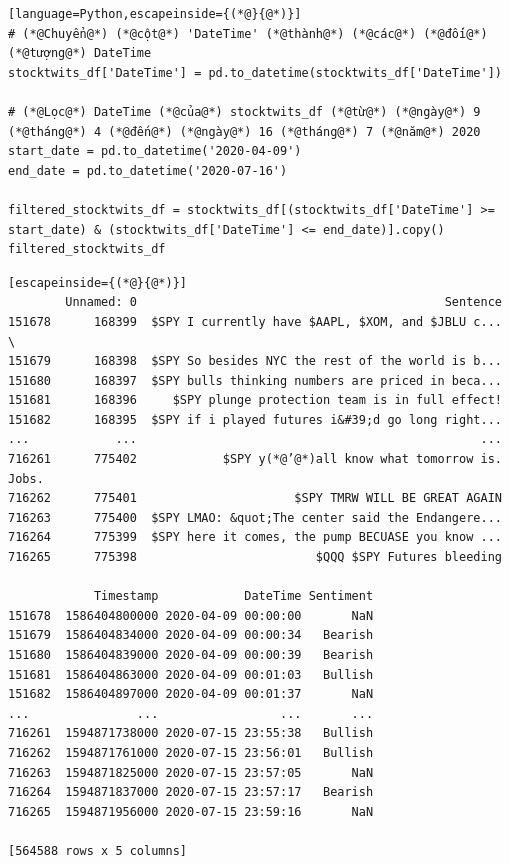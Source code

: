 \begin{lstlisting}[language=Python,escapeinside={(*@}{@*)}]
# (*@Chuyển@*) (*@cột@*) 'DateTime' (*@thành@*) (*@các@*) (*@đối@*) (*@tượng@*) DateTime
stocktwits_df['DateTime'] = pd.to_datetime(stocktwits_df['DateTime'])

# (*@Lọc@*) DateTime (*@của@*) stocktwits_df (*@từ@*) (*@ngày@*) 9 (*@tháng@*) 4 (*@đến@*) (*@ngày@*) 16 (*@tháng@*) 7 (*@năm@*) 2020
start_date = pd.to_datetime('2020-04-09')
end_date = pd.to_datetime('2020-07-16')

filtered_stocktwits_df = stocktwits_df[(stocktwits_df['DateTime'] >= start_date) & (stocktwits_df['DateTime'] <= end_date)].copy()
filtered_stocktwits_df
\end{lstlisting}

\begin{lstlisting}[escapeinside={(*@}{@*)}]
        Unnamed: 0                                           Sentence   
151678      168399  $SPY I currently have $AAPL, $XOM, and $JBLU c...  \
151679      168398  $SPY So besides NYC the rest of the world is b...   
151680      168397  $SPY bulls thinking numbers are priced in beca...   
151681      168396     $SPY plunge protection team is in full effect!   
151682      168395  $SPY if i played futures i&#39;d go long right...   
...            ...                                                ...   
716261      775402            $SPY y(*@’@*)all know what tomorrow is. Jobs.   
716262      775401                      $SPY TMRW WILL BE GREAT AGAIN   
716263      775400  $SPY LMAO: &quot;The center said the Endangere...   
716264      775399  $SPY here it comes, the pump BECUASE you know ...   
716265      775398                         $QQQ $SPY Futures bleeding   

            Timestamp            DateTime Sentiment  
151678  1586404800000 2020-04-09 00:00:00       NaN  
151679  1586404834000 2020-04-09 00:00:34   Bearish  
151680  1586404839000 2020-04-09 00:00:39   Bearish  
151681  1586404863000 2020-04-09 00:01:03   Bullish  
151682  1586404897000 2020-04-09 00:01:37       NaN  
...               ...                 ...       ...  
716261  1594871738000 2020-07-15 23:55:38   Bullish  
716262  1594871761000 2020-07-15 23:56:01   Bullish  
716263  1594871825000 2020-07-15 23:57:05       NaN  
716264  1594871837000 2020-07-15 23:57:17   Bearish  
716265  1594871956000 2020-07-15 23:59:16       NaN  

[564588 rows x 5 columns]
\end{lstlisting}

